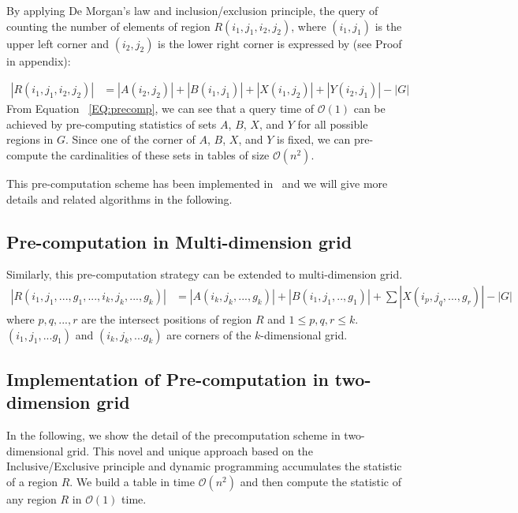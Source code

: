 \documentclass[AMA,LATO1COL]{WileyNJD-v2}
\newcommand\bigo{\mathcal O}
\begin{document}
By applying De Morgan's law and inclusion/exclusion principle, the
query of counting the number of elements of region
$R(i_1,j_1,i_2,j_2)$, where $(i_1,j_1)$ is the upper left corner and
$(i_2,j_2)$ is the lower right corner is expressed by (see Proof in
appendix):


\begin{equation}
\label{EQ:precomp}
\begin{split}
|R(i_1,j_1,i_2,j_2)|& = |A(i_2,j_2)| + |B(i_1,j_1)| + |X(i_1,j_2)|  + |Y(i_2,j_1)| - |G|
\end{split}
\end{equation}
\normalsize From Equation ~\ref{EQ:precomp}, we can see that a query
time of $\bigo(1)$ can be achieved by pre-computing statistics of sets
$A$, $B$, $X$, and $Y$ for all possible regions in $G$. Since one of
the corner of $A$, $B$, $X$, and $Y$ is fixed, we can pre-compute the
cardinalities of these sets in tables of size $\bigo(n^2)$.

This pre-computation scheme has been implemented in~\cite{apweb} and
we will give more details and related algorithms in the following.

\subsection{Pre-computation in Multi-dimension grid}
Similarly, this  pre-computation strategy can be extended to multi-dimension grid.
\begin{equation}
\label{EQ:precomp}
\begin{split}
|R(i_1,j_1,...,g_1,...,i_k,j_k,...,g_k)|& = |A(i_k,j_k,...,g_k)| + |B(i_1,j_1,..,g_1)| + \sum |X(i_p,j_q,...,g_r)| - |G|
\end{split}
\end{equation}
where $p,q,...,r$ are the intersect positions of region $R$  and  $1\leq p,q,r \leq k $. $(i_1,j_1,...g_1)$ and  $(i_k,j_k,...g_k)$ are corners of the $k$-dimensional grid. 

\subsection{Implementation of Pre-computation in two-dimension grid}
In the following, we show the detail of the precomputation scheme in two-dimensional grid. This novel and unique approach based on the Inclusive/Exclusive principle and
dynamic programming accumulates the statistic of a region $R$. We build a table in time $\bigo(n^2)$ and then compute the statistic of any region $R$ in $\bigo(1)$ time.
\end{document}
